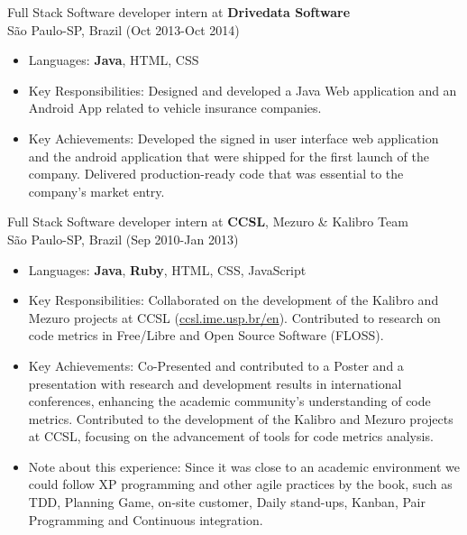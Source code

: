 \normalsize{Full Stack Software developer intern at \textbf{Drivedata Software}}\\
        \scriptsize{São Paulo-SP, Brazil (Oct 2013-Oct 2014)}
\begin{itemize}
    \item \footnotesize{Languages:}\scriptsize{ \textbf{Java}, HTML, CSS}
    \item \footnotesize{Key Responsibilities:}\scriptsize{ Designed and developed a Java Web application and an Android App related to vehicle insurance companies.}
    \item \footnotesize{Key Achievements:}\scriptsize{ Developed the signed in user interface web application and the android application that were shipped for the first launch of the company. Delivered production-ready code that was essential to the company's market entry.}
\end{itemize}


\normalsize{Full Stack Software developer intern at \textbf{CCSL}, Mezuro \& Kalibro Team}\\
        \scriptsize{São Paulo-SP, Brazil (Sep 2010-Jan 2013)}
\begin{itemize}
    \item \footnotesize{Languages:}\scriptsize{ \textbf{Java}, \textbf{Ruby}, HTML, CSS, JavaScript}
    \item \footnotesize{Key Responsibilities:}\scriptsize{ Collaborated on the development of the Kalibro and Mezuro projects at CCSL (\href{http://ccsl.ime.usp.br/en}{ccsl.ime.usp.br/en}). Contributed to research on code metrics in Free/Libre and Open Source Software (FLOSS).}
    \item \footnotesize{Key Achievements:}\scriptsize{ Co-Presented and contributed to a Poster and a presentation with research and development results in international conferences, enhancing the academic community's understanding of code metrics. Contributed to the development of the Kalibro and Mezuro projects at CCSL, focusing on the advancement of tools for code metrics analysis.}
    \item \footnotesize{Note about this experience:}\scriptsize{ Since it was close to an academic environment we could follow XP programming and other agile practices by the book, such as TDD, Planning Game, on-site customer, Daily stand-ups, Kanban, Pair Programming and Continuous integration.}
\end{itemize}

